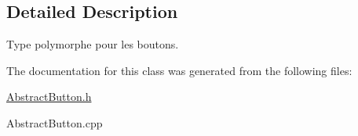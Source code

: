 \subsection{Detailed Description}
Type polymorphe pour les boutons. 

The documentation for this class was generated from the following files\+:\begin{DoxyCompactItemize}
\item 
\hyperlink{AbstractButton_8h}{Abstract\+Button.\+h}\item 
Abstract\+Button.\+cpp\end{DoxyCompactItemize}

